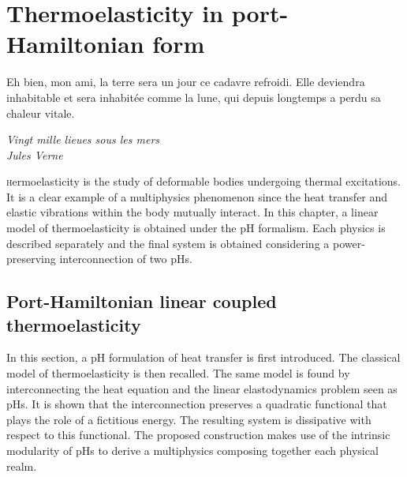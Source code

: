 \chapter{Thermoelasticity in port-Hamiltonian form}

\epigraph{Eh bien, mon ami, la terre sera un jour ce cadavre refroidi. Elle deviendra inhabitable et sera inhabitée comme la lune, qui depuis longtemps a perdu sa chaleur vitale.}{\textit{Vingt mille lieues sous les mers\\
Jules Verne}}
\minitoc
 
\lettrine{\color{theme}{T}}hermoelasticity is the study of deformable bodies undergoing thermal excitations. It is a clear example of a multiphysics phenomenon since the heat transfer and elastic vibrations within the body mutually interact. In this chapter, a linear model of thermoelasticity is obtained under the pH formalism. Each physics is described separately and the final system is obtained considering a power-preserving interconnection of two pHs.

\begin{comment}
The first work on this discipline dates back to \cite{duhamel1837}, but it was only more than a century later, thanks to the paper of Biot \cite{biot1956thermoelasticity}, that research on this topic received a new impulse.
\end{comment}

\section{Port-Hamiltonian linear coupled thermoelasticity}\label{sec:phthel}
In this section, a pH formulation of heat transfer is first introduced. The classical model of thermoelasticity is then recalled. The same model is found by interconnecting the heat equation and the linear elastodynamics problem seen as pHs. It is shown that the interconnection preserves a quadratic functional that plays the role of a fictitious energy. The resulting system is dissipative  with respect to this functional. The proposed construction makes use of the intrinsic modularity of pHs \cite{kurula2010} to derive a multiphysics composing together each physical realm.

